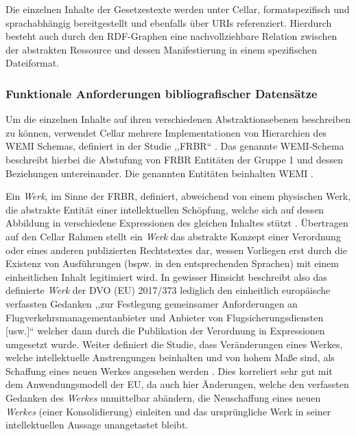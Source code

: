     Die einzelnen Inhalte der Gesetzestexte werden unter Cellar, formatspezifisch und sprachabhängig bereitgestellt und ebenfalls über \acp{URI} referenziert. 
    Hierdurch besteht auch durch den \ac{RDF}-Graphen eine nachvollziehbare Relation zwischen der abstrakten Ressource und dessen Manifestierung in einem spezifischen Dateiformat.
    
\subsubsection{Funktionale Anforderungen bibliografischer Datensätze}\label{frbr}
        
    Um die einzelnen Inhalte auf ihren verschiedenen Abstraktionsebenen beschreiben zu können, verwendet Cellar mehrere Implementationen von Hierarchien des \acs{WEMI} Schemas, definiert in der Studie ,,\ac{FRBR}`` \cite[S. 29f]{eu_cellar}.
    Das genannte \acs{WEMI}-Schema beschreibt hierbei die Abstufung von \ac{FRBR} Entitäten der Gruppe 1 und dessen Beziehungen untereinander. 
    Die genannten Entitäten beinhalten \ac{WEMI} \cite[12]{eu_frbr}.

    \medskip
    Ein \textit{Werk}, im Sinne der \ac{FRBR}, definiert, abweichend von einem physischen Werk, die abstrakte Entität einer intellektuellen Schöpfung, welche sich auf dessen Abbildung in verschiedene Expressionen des gleichen Inhaltes stützt 
    \cite[S. 16f]{eu_frbr}.
    Übertragen auf den Cellar Rahmen stellt ein \textit{Werk} das abstrakte Konzept einer Verordnung oder eines anderen publizierten Rechtstextes dar, wessen Vorliegen erst durch die Existenz von Ausführungen (bspw. in den entsprechenden Sprachen) mit einem einheitlichen Inhalt legitimiert wird. 
    In gewisser Hinsicht beschreibt also das definierte \textit{Werk} der \acs{DVO} (\ac{EU})  2017/373 lediglich den einheitlich europäische verfassten Gedanken ,,zur Festlegung gemeinsamer Anforderungen an Flugverkehrsmanagementanbieter und Anbieter von Flugsicherungsdiensten [usw.]`` welcher dann durch die Publikation der Verordnung in Expressionen umgesetzt wurde.
    Weiter definiert die Studie, dass Veränderungen eines Werkes, welche intellektuelle Anstrengungen beinhalten und von hohem Maße sind, als Schaffung eines neuen Werkes angesehen werden \cite[17]{eu_frbr}.
    Dies korreliert sehr gut mit dem Anwendungsmodell der \ac{EU}, da auch hier Änderungen, welche den verfassten Gedanken des \textit{Werkes} unmittelbar abändern, die Neuschaffung eines neuen \textit{Werkes} (einer Konsolidierung) einleiten und das ursprüngliche Werk in seiner intellektuellen Aussage unangetastet bleibt.
    
